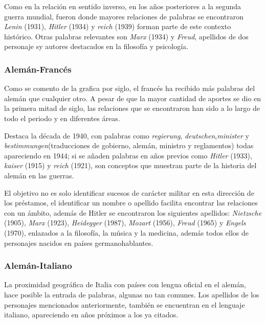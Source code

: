 Como en la relación en sentido inverso, en los años posteriores a la segunda guerra mundial,  fueron donde mayores relaciones de palabras se encontraron  \textit{Lenin} (1931), \textit{Hitler} (1934) y \textit{reich} (1939) forman parte  de este contexto histórico.  Otras palabras relevantes son \textit{Marx} (1934) y \textit{Freud}, apellidos de dos personaje sy autores destacados en la filosofía y psicología. 


\subsubsection*{Alemán-Francés}%

Como se comento de la grafica por siglo, el francés ha recibido más palabras del alemán que cualquier otro. A pesar de que la mayor cantidad de aportes se dio en la primera mitad de siglo, las relaciones que se encontraron han sido a lo largo de todo el periodo y en diferentes áreas. 

Destaca la década de 1940, con palabras como \textit{regierung},  \textit{deutschen},\textit{minister} y  \textit{bestimmungen}(traducciones de gobierno, alemán, ministro y reglamentos) todas apareciendo en 1944;  si se añaden palabras en años previos como \textit{Hitler} (1933), \textit{kaiser} (1915) y \textit{reich} (1921), son conceptos que muestran parte de la historia del alemán en las guerras. 

El objetivo no es solo identificar sucesos de carácter militar en esta dirección de los préstamos, el identificar un nombre o apellido facilita encontrar las relaciones con un ámbito,  además de Hitler se encontraron los siguientes apellidos:  \textit{Nietzsche} (1905),  \textit{Marx} (1923), \textit{Heidegger} (1987),  \textit{Mozart} (1956), \textit{Freud} (1965) y \textit{Engels} (1970), enlazados a la filosofía, la música y la medicina,  además todos ellos de personajes nacidos en países germanohablantes.


\subsubsection*{Alemán-Italiano}%

La proximidad geográfica de Italia con países con lengua oficial en el alemán, hace posible la entrada de palabras, algunas no tan comunes.  Los apellidos de los personajes mencionados anteriormente, también se encuentran en el lenguaje italiano, apareciendo en años próximos a los ya citados.  


